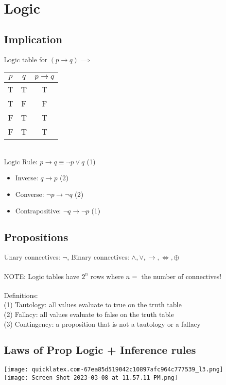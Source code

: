 
\section{Logic}
\subsection{Implication}
Logic table for $(p \rightarrow q) \implies$ 
\begin{tabular}{c|c|c}
    $p$ & $q$ & $p \rightarrow q$ \\
     \hline
     T & T & T \\
     T & F & F \\
     F & T & T \\
     F & T & T
\end{tabular} \\
Logic Rule: $p \rightarrow q \equiv \neg p \vee q$ (1)
\begin{itemize}
    \item Inverse: $q \rightarrow p$ (2)
    \item Converse: $\neg p \rightarrow \neg q$ (2)
    \item Contrapositive: $\neg q \rightarrow \neg p$ (1)
\end{itemize}
\subsection{Propositions}
Unary connectives: $\neg$, Binary connectives: $\wedge, \vee, \rightarrow, \iff, \oplus$\\
\\
NOTE: Logic tables have $2^n$ rows where $n = $ the number of connectives!\\
\\
Definitions:\\
(1) Tautology: all values evaluate to true on the truth table\\
(2) Fallacy: all values evaluate to false on the truth table\\
(3) Contingency: a proposition that is not a tautology or a fallacy
\subsection{Laws of Prop Logic + Inference rules}
\texttt{[image: quicklatex.com-67ea85d519042c10897afc964c777539\_l3.png]}   
\texttt{[image: Screen Shot 2023-03-08 at 11.57.11 PM.png]}
